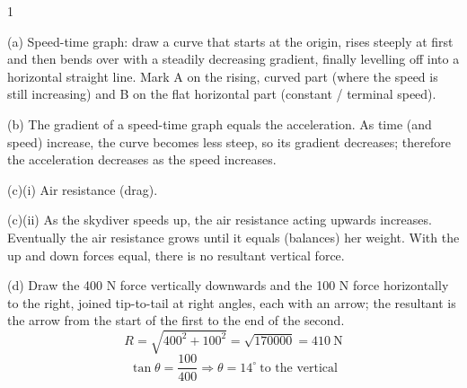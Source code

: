 \subject{Physics}

\begin{question}{1}
\markscheme
{}
\endms

\exemplar
(a) Speed-time graph: draw a curve that starts at the origin, rises steeply at first and then bends over with a steadily decreasing gradient, finally levelling off into a horizontal straight line. Mark A on the rising, curved part (where the speed is still increasing) and B on the flat horizontal part (constant / terminal speed).

(b) The gradient of a speed-time graph equals the acceleration. As time (and speed) increase, the curve becomes less steep, so its gradient decreases; therefore the acceleration decreases as the speed increases.

(c)(i) Air resistance (drag).

(c)(ii) As the skydiver speeds up, the air resistance acting upwards increases. Eventually the air resistance grows until it equals (balances) her weight. With the up and down forces equal, there is no resultant vertical force.

(d) Draw the 400 N force vertically downwards and the 100 N force horizontally to the right, joined tip-to-tail at right angles, each with an arrow; the resultant is the arrow from the start of the first to the end of the second.
$$ R = \sqrt{400^{2} + 100^{2}} = \sqrt{170000} = 410\ \text{N} $$
$$ \tan\theta = \frac{100}{400} \Rightarrow \theta = 14^{\circ}\ \text{to the vertical} $$
\endexemplar
\end{question}

